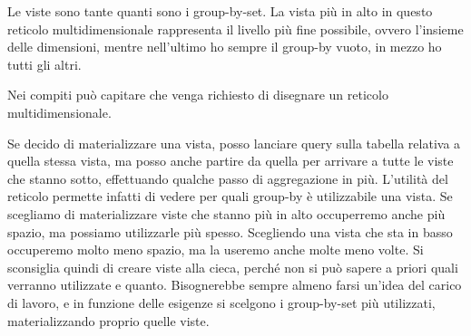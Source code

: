 Le viste sono tante quanti sono i group-by-set.
\noindent La vista più in alto in questo reticolo multidimensionale rappresenta il livello più fine possibile, ovvero l'insieme delle dimensioni, mentre nell'ultimo ho sempre il group-by vuoto, in mezzo ho tutti gli altri.
\begin{warn}
	Nei compiti può capitare che venga richiesto di disegnare un reticolo multidimensionale.
\end{warn}
Se decido di materializzare una vista, posso lanciare query sulla tabella relativa a quella stessa vista, ma posso anche partire da quella per arrivare a tutte le viste che stanno sotto, effettuando qualche passo di aggregazione in più.\newline
L'utilità del reticolo permette infatti di vedere per quali group-by è utilizzabile una vista.\newline
Se scegliamo di materializzare viste che stanno più in alto occuperremo anche più spazio, ma possiamo utilizzarle più spesso. Scegliendo una vista che sta in basso occuperemo molto meno spazio, ma la useremo anche molte meno volte.\newline
Si sconsiglia quindi di creare viste alla cieca, perché non si può sapere a priori quali verranno utilizzate e quanto. Bisognerebbe sempre almeno farsi un'idea del carico di lavoro, e in funzione delle esigenze si scelgono i group-by-set più utilizzati, materializzando proprio quelle viste.
